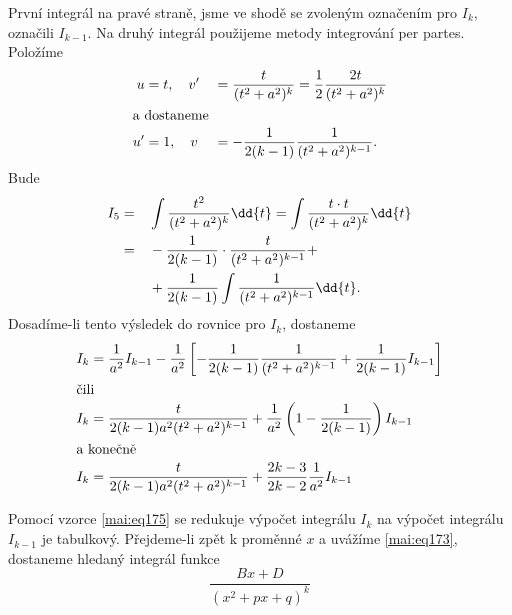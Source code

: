       První integrál na pravé straně, jsme ve shodě se zvoleným označením pro \(I_k\), označili
      \(I_{k-1}\). Na druhý integrál použijeme metody integrování per partes. Položíme 
      \begin{alignat*}{2}
        u  &= t, \quad v' &&=   \dfrac{t}{(t^2+a^2)^k} = \dfrac{1}{2}\dfrac{2t}{(t^2+a^2)^k}   \\
        \shortintertext{a dostaneme}
        u' &= 1, \quad v  &&= - \dfrac{1}{2(k-1)}\dfrac{1}{(t^2+a^2)^{k-1}}.
      \end{alignat*}
      Bude
      \begin{alignat}{2}
        I_5 &=  &&{} \int\dfrac{t^2}{(t^2+a^2)^k}\dd{t} =
                     \int\dfrac{t\cdot t}{(t^2+a^2)^k}\dd{t}                 \notag \\
            &=  &&-  \dfrac{1}{2(k-1)}\cdot\dfrac{t}{(t^2+a^2)^{k-1}} +      \notag \\
            &{} &&+  \dfrac{1}{2(k-1)}\int\dfrac{1}{(t^2+a^2)^{k-1}}\dd{t}.  \label{mai:eq174}
      \end{alignat}
      Dosadíme-li tento výsledek do rovnice pro \(I_k\), dostaneme
      \begin{gather}
        \begin{aligned}
        I_k &= \dfrac{1}{a^2}I_{k-1} - \dfrac{1}{a^2}
              \left[
                -\dfrac{1}{2(k-1)}\dfrac{1}{(t^2+a^2)^{k-1}} + \dfrac{1}{2(k-1)}I_{k-1}                
              \right]                                                                            \\
        \shortintertext{čili}     
        I_k &= \dfrac{t}{2(k-1)a^2(t^2+a^2)^{k-1}} + 
               \dfrac{1}{a^2}\left(1-\dfrac{1}{2(k-1)}\right)I_{k-1}                      \notag \\               
        \shortintertext{a konečně}
        I_k &= \dfrac{t}{2(k-1)a^2(t^2+a^2)^{k-1}} + 
              \dfrac{2k-3}{2k-2}\dfrac{1}{a^2}I_{k-1}                              \label{mai:eq175}
      \end{aligned}  
    \end{gather}

      Pomocí vzorce \ref{mai:eq175} se redukuje výpočet integrálu \(I_k\) na výpočet integrálu
      \(I_{k-1}\) je tabulkový. Přejdeme-li zpět k proměnné \(x\) a uvážíme \ref{mai:eq173},
      dostaneme hledaný integrál funkce
      \begin{equation*}
        \dfrac{Bx + D}{(x^2+px+q)^k}
      \end{equation*}

